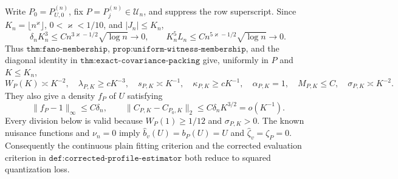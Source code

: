 Write \(P_0=P_{U,0}^{(n)}\), fix \(P=P_j^{(n)}\in\mathcal U_n\), and suppress the row superscript.  Since \(K_n=\lfloor n^{\varkappa}\rfloor\), \(0<\varkappa<1/10\), and \(|J_n|\leq K_n\),
\[
 \delta_nK_n^3\leq Cn^{3\varkappa-1/2}\sqrt{\log n}\longrightarrow0,
 \qquad
 K_n^5L_n\leq Cn^{5\varkappa-1/2}\sqrt{\log n}\longrightarrow0.                 \tag{1}
\]
Thus \(\texttt{thm:fano-membership}\), \(\texttt{prop:uniform-witness-membership}\), and the diagonal identity in \(\texttt{thm:exact-covariance-packing}\) give, uniformly in \(P\) and \(K\leq K_n\),
\[
 W_P(K)\asymp K^{-2},\quad \lambda_{P,K}\geq cK^{-3},\quad
 s_{P,K}\asymp K^{-1},\quad \kappa_{P,K}\geq cK^{-1},\quad
 \alpha_{P,K}=1,\quad M_{P,K}\leq C,\quad \sigma_{P,K}\asymp K^{-2}.          \tag{2}
\]
They also give a density \(f_P\) of \(U\) satisfying
\[
 \|f_P-1\|_\infty\leq C\delta_n,\qquad
 \|C_{P,K}-C_{P_0,K}\|_2\leq C\delta_nK^{3/2}=o(K^{-1}).                       \tag{3}
\]
Every division below is valid because \(W_P(1)\geq1/12\) and \(\sigma_{P,K}>0\).  The known nuisance functions and \(\nu_n=0\) imply \(\widehat b_v(U)=b_P(U)=U\) and \(\widehat\zeta_v=\zeta_P=0\).  Consequently the continuous plain fitting criterion and the corrected evaluation criterion in \(\texttt{def:corrected-profile-estimator}\) both reduce to squared quantization loss.

